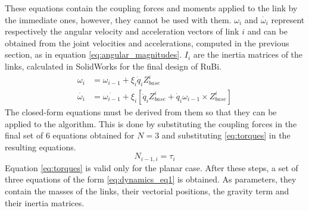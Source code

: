 These equations contain the coupling forces and moments applied to the link by the immediate ones, however, they cannot be used with them. 
$\omega_{i}$ and $\dot{\omega_{i}}$ represent respectively the angular velocity and acceleration vectors of link $i$ and can be obtained from the joint velocities and accelerations, computed in the previous section, as in equation \ref{eq:angular_magnitudes}.
$I_{i}$ are the inertia matrices of the links, calculated in SolidWorks for the final design of RuBi.
\begin{equation}
\label{eq:angular_magnitudes}	
	\begin{aligned}
		\omega_{i} &= \omega_{i-1} + \xi_{i}\dot{q}_{i}Z_{base}^i\\
		\dot{\omega_{i}} &= \dot{\omega_{i-1}} + \xi_{i}[\ddot{q}_{i}Z_{base}^i + \dot{q}_{i}\omega_{i-1} \times Z_{base}^i]
	\end{aligned}
\end{equation}
The closed-form equations must be derived from them so that they can be applied to the algorithm.
This is done by substituting the coupling forces in the final set of 6 equations obtained for $N=3$ and substituting \ref{eq:torques} in the resulting equations.
\begin{equation}
\label{eq:torques}
	N_{i - 1 , i} = \tau_{i}
\end{equation}
Equation \ref{eq:torques} is valid only for the planar case.
After these steps, a set of three equations of the form \ref{eq:dynamics_eq1} is obtained. 
As parameters, they contain the masses of the links, their vectorial positions, the gravity term and their inertia matrices. 

